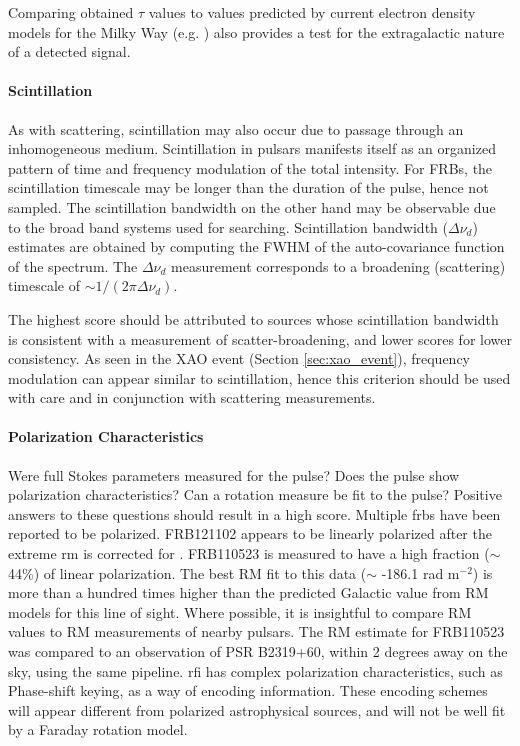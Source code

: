\documentclass[a4paper,fleqn,usenatbib]{mnras}
\begin{document}
Comparing obtained $\tau$ values to values predicted by current electron density
models for the Milky Way (e.g.
\citealt{2002astro.ph..7156C,2017ApJ...835...29Y}) also provides a test for the
extragalactic nature of a detected signal.

\paragraph{Scintillation}

As with scattering, scintillation may also occur due to passage through an
inhomogeneous medium. Scintillation in pulsars manifests itself as an organized
pattern of time and frequency modulation of the total intensity. For FRBs, the
scintillation timescale may be longer than the duration of the pulse, hence not
sampled. The scintillation bandwidth on the other hand may be observable due to
the broad band systems used for searching.  Scintillation bandwidth ($\Delta
\nu_d$) estimates are obtained by computing the FWHM of the auto-covariance
function of the spectrum.  The $\Delta \nu_d$ measurement corresponds to a
broadening (scattering) timescale of $\sim 1/(2\pi\Delta \nu_d)$.  

The highest score should be attributed to sources whose scintillation bandwidth
is consistent with a measurement of scatter-broadening, and lower scores for
lower consistency. As seen in the XAO event (Section \ref{sec:xao_event}),
frequency modulation can appear similar to scintillation, hence this criterion
should be used with care and in conjunction with scattering measurements. 

\paragraph{Polarization Characteristics}

Were full Stokes parameters measured for the pulse? Does the pulse show
polarization characteristics? Can a rotation measure be fit to the pulse?
Positive answers to these questions should result in a high score.  Multiple
\glspl{frb} have been reported to be polarized.  FRB121102 appears to be
linearly polarized after the extreme \gls{rm} is corrected for
\citep{2018Natur.553..182M}. FRB110523 is measured to have a high fraction
($\sim$ 44\%) of linear polarization. The best RM fit to this data ($\sim$
-186.1 rad m$^{-2}$) is more than a hundred times higher than the predicted
Galactic value from RM models for this line of sight. Where possible, it is
insightful to compare RM values to RM measurements of nearby pulsars. The RM
estimate for FRB110523 was compared to an observation of PSR B2319+60, within
2 degrees away on the sky, using the same pipeline.  \gls{rfi} has complex
polarization characteristics, such as Phase-shift keying, as a way of encoding
information.  These encoding schemes will appear different from polarized
astrophysical sources, and will not be well fit by a Faraday rotation model.
\end{document}
